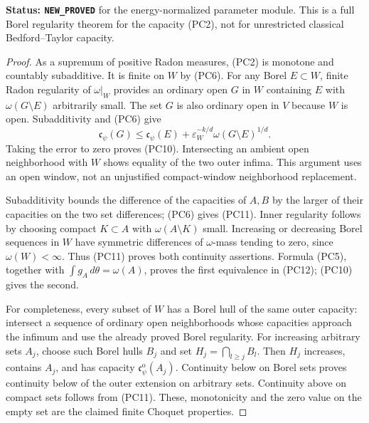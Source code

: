 \documentclass[11pt,a4paper]{article}
\numberwithin{equation}{section}
\theoremstyle{definition}
\theoremstyle{remark}
\begin{document}
\noindent\textbf{Status: \texttt{NEW\_PROVED}} for the
energy-normalized parameter module. This is a full Borel
regularity theorem for the capacity (PC2), not for unrestricted
classical Bedford--Taylor capacity.

\begin{proof}
As a supremum of positive Radon measures, (PC2) is monotone and
countably subadditive. It is finite on $W$ by (PC6). For any
Borel $E\subset W$, finite Radon regularity of $\omega|_W$
provides an ordinary open $G$ in $W$ containing $E$ with
$\omega(G\setminus E)$ arbitrarily small. The set $G$ is also
ordinary open in $V$ because $W$ is open. Subadditivity and
(PC6) give
\[
             \mathfrak c_\psi(G)
               \le\mathfrak c_\psi(E)
                      +\varepsilon_W^{-k/d}\omega(G\setminus E)^{1/d}.
\]
Taking the error to zero proves (PC10). Intersecting an ambient
open neighborhood with $W$ shows equality of the two outer
infima. This argument uses an open window, not an unjustified
compact-window neighborhood replacement.

Subadditivity bounds the difference of the capacities of $A,B$
by the larger of their capacities on the two set differences;
(PC6) gives (PC11). Inner regularity follows by choosing compact
$K\subset A$ with $\omega(A\setminus K)$ small. Increasing
or decreasing Borel sequences in $W$ have symmetric differences
of $\omega$-mass tending to zero, since $\omega(W)<\infty$.
Thus (PC11) proves both continuity assertions. Formula (PC5),
together with $\int g_A\,d\theta=\omega(A)$, proves the first
equivalence in (PC12); (PC10) gives the second.

For completeness, every subset of $W$ has a Borel hull of the
same outer capacity: intersect a sequence of ordinary open
neighborhoods whose capacities approach the infimum and use
the already proved Borel regularity. For increasing arbitrary
sets $A_j$, choose such Borel hulls $B_j$ and set
$H_j=\bigcap_{l\ge j}B_l$. Then $H_j$ increases, contains
$A_j$, and has capacity $\mathfrak c_\psi^{\mathrm o}(A_j)$.
Continuity below on Borel sets proves continuity below of the
outer extension on arbitrary sets. Continuity above on compact
sets follows from (PC11). These, monotonicity and the zero value
on the empty set are the claimed finite Choquet properties.
\end{proof}
\end{document}
